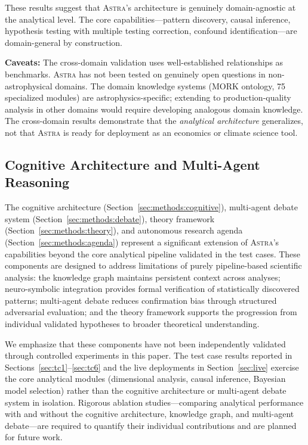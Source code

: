 \documentclass[usenatbib]{rasti}
\newcommand{\astra}{\textsc{Astra}\xspace}
\begin{document}
These results suggest that \astra's architecture is genuinely domain-agnostic at the analytical level.
The core capabilities---pattern discovery, causal inference, hypothesis testing with multiple testing correction, confound identification---are domain-general by construction.

\textbf{Caveats:}
The cross-domain validation uses well-established relationships as benchmarks. \astra has not been tested on genuinely open questions in non-astrophysical domains.
The domain knowledge systems (MORK ontology, 75 specialized modules) are astrophysics-specific; extending to production-quality analysis in other domains would require developing analogous domain knowledge.
The cross-domain results demonstrate that the \emph{analytical architecture} generalizes, not that \astra is ready for deployment as an economics or climate science tool.

\subsection{Cognitive Architecture and Multi-Agent Reasoning}
\label{sec:discussion:cognitive}

The cognitive architecture (Section~\ref{sec:methods:cognitive}), multi-agent debate system (Section~\ref{sec:methods:debate}), theory framework (Section~\ref{sec:methods:theory}), and autonomous research agenda (Section~\ref{sec:methods:agenda}) represent a significant extension of \astra's capabilities beyond the core analytical pipeline validated in the test cases.
These components are designed to address limitations of purely pipeline-based scientific analysis: the knowledge graph maintains persistent context across analyses; neuro-symbolic integration provides formal verification of statistically discovered patterns; multi-agent debate reduces confirmation bias through structured adversarial evaluation; and the theory framework supports the progression from individual validated hypotheses to broader theoretical understanding.

We emphasize that these components have not been independently validated through controlled experiments in this paper.
The test case results reported in Sections~\ref{sec:tc1}--\ref{sec:tc6} and the live deployments in Section~\ref{sec:live} exercise the core analytical modules (dimensional analysis, causal inference, Bayesian model selection) rather than the cognitive architecture or multi-agent debate system in isolation.
Rigorous ablation studies---comparing analytical performance with and without the cognitive architecture, knowledge graph, and multi-agent debate---are required to quantify their individual contributions and are planned for future work.
\end{document}
